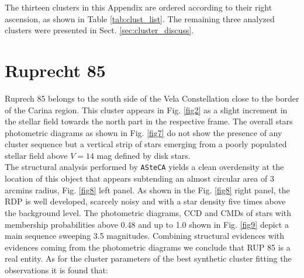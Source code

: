 \documentclass[draft]{aa}
\begin{document}




















































\appendix

The thirteen clusters in this Appendix are ordered according to their right
ascension, as shown in Table \ref{tab:clust_list}. The remaining three analyzed
clusters were presented in Sect. \ref{sec:cluster_discuss}.

\section{Ruprecht 85}

Ruprech 85 belongs to the south side of the Vela Constellation close to the
border of the Carina region. This cluster appears in Fig. \ref{fig2} as a slight
increment in the stellar field towards the north part in the respective frame.
The overall stars photometric diagrams as shown in Fig. \ref{fig7} do not show
the presence of any cluster sequence but a vertical strip of stars emerging from
a poorly populated stellar field above $V= 14$ mag defined by disk stars.\\

The structural analysis performed by \texttt{ASteCA} yields a clean overdensity
at the location of this object that appears subtending an almost circular area
of 3 arcmins radius, Fig. \ref{fig8} left panel. As shown in the Fig. \ref{fig8}
right panel, the RDP is well developed, scarcely noisy and with a star density
five times above the background level. The photometric diagrams, CCD and CMDs of
stars with membership probabilities above 0.48 and up to 1.0 shown in Fig.
\ref{fig9} depict a main sequence sweeping 3.5 magnitudes. Combining structural
evidences with evidences coming from the photometric diagrams we conclude that
RUP 85 is a real entity. As for the cluster parameters of the best synthetic
cluster fitting the observations it is found that:
\end{document}
